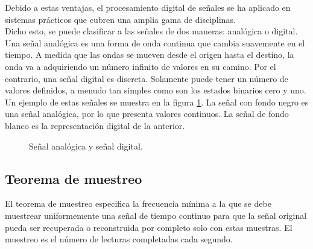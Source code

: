 	Debido a estas ventajas, el procesamiento digital de señales se ha aplicado en sistemas prácticos que cubren una amplia gama de disciplinas. \cite{proakis} \\
	
	Dicho esto, se puede clasificar a las señales de dos maneras: analógica o digital. Una señal analógica es una forma de onda continua que cambia suavemente en el tiempo. A medida que las ondas se mueven desde el origen hasta el destino, la onda va a adquiriendo un número infinito de valores en su camino. Por el contrario, una señal digital es discreta. Solamente puede tener un número de valores definidos, a menudo tan simples como son los estados binarios cero y uno. \cite{signal} \\
			
	Un ejemplo de estas señales se muestra en la figura \ref{fig:analog-digital}. La señal con fondo negro es una señal analógica, por lo que presenta valores continuos. La señal de fondo blanco es la representación digital de la anterior. \\
	
	\begin{figure}[htbp!]
		\centering
		\caption{Señal analógica y señal digital.}
		\label{fig:analog-digital}
	\end{figure}
	
	\subsection{Teorema de muestreo}
	El teorema de muestreo especifica la frecuencia mínima a la que se debe muestrear uniformemente una señal de tiempo continuo para que la señal original pueda ser recuperada o reconstruida por completo solo con estas muestras. El muestreo es el número de lecturas completadas cada segundo. \\
	
